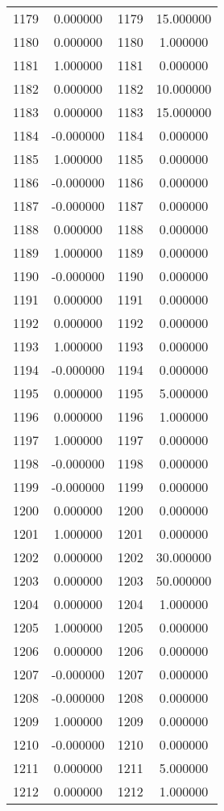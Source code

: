 \documentclass[12pt]{article}
\begin{document}
\begin{longtable}{@{}cccc@{}}
1179 & 0.000000 & 1179 & 15.000000 \\
1180 & 0.000000 & 1180 & 1.000000 \\
1181 & 1.000000 & 1181 & 0.000000 \\
1182 & 0.000000 & 1182 & 10.000000 \\
1183 & 0.000000 & 1183 & 15.000000 \\
1184 & -0.000000 & 1184 & 0.000000 \\
1185 & 1.000000 & 1185 & 0.000000 \\
1186 & -0.000000 & 1186 & 0.000000 \\
1187 & -0.000000 & 1187 & 0.000000 \\
1188 & 0.000000 & 1188 & 0.000000 \\
1189 & 1.000000 & 1189 & 0.000000 \\
1190 & -0.000000 & 1190 & 0.000000 \\
1191 & 0.000000 & 1191 & 0.000000 \\
1192 & 0.000000 & 1192 & 0.000000 \\
1193 & 1.000000 & 1193 & 0.000000 \\
1194 & -0.000000 & 1194 & 0.000000 \\
1195 & 0.000000 & 1195 & 5.000000 \\
1196 & 0.000000 & 1196 & 1.000000 \\
1197 & 1.000000 & 1197 & 0.000000 \\
1198 & -0.000000 & 1198 & 0.000000 \\
1199 & -0.000000 & 1199 & 0.000000 \\
1200 & 0.000000 & 1200 & 0.000000 \\
1201 & 1.000000 & 1201 & 0.000000 \\
1202 & 0.000000 & 1202 & 30.000000 \\
1203 & 0.000000 & 1203 & 50.000000 \\
1204 & 0.000000 & 1204 & 1.000000 \\
1205 & 1.000000 & 1205 & 0.000000 \\
1206 & 0.000000 & 1206 & 0.000000 \\
1207 & -0.000000 & 1207 & 0.000000 \\
1208 & -0.000000 & 1208 & 0.000000 \\
1209 & 1.000000 & 1209 & 0.000000 \\
1210 & -0.000000 & 1210 & 0.000000 \\
1211 & 0.000000 & 1211 & 5.000000 \\
1212 & 0.000000 & 1212 & 1.000000 \\

\end{longtable}
\end{document}
